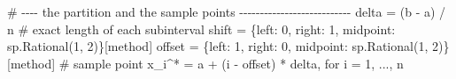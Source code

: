 \documentclass[
  letterpaper,
  DIV=11,
  numbers=noendperiod]{scrreprt}
\newenvironment{Shaded}{\begin{snugshade}}{\end{snugshade}}
\newcommand{\CommentTok}[1]{\textcolor[rgb]{0.37,0.37,0.37}{#1}}
\newcommand{\DecValTok}[1]{\textcolor[rgb]{0.68,0.00,0.00}{#1}}
\newcommand{\NormalTok}[1]{\textcolor[rgb]{0.00,0.23,0.31}{#1}}
\newcommand{\OperatorTok}[1]{\textcolor[rgb]{0.37,0.37,0.37}{#1}}
\newcommand{\StringTok}[1]{\textcolor[rgb]{0.13,0.47,0.30}{#1}}
\theoremstyle{plain}
\theoremstyle{plain}
\theoremstyle{definition}
\theoremstyle{definition}
\theoremstyle{definition}
\theoremstyle{plain}
\theoremstyle{plain}
\theoremstyle{remark}
\begin{document}
\begin{Shaded}
\begin{Highlighting}[]
    \CommentTok{\# {-}{-}{-}{-} the partition and the sample points {-}{-}{-}{-}{-}{-}{-}{-}{-}{-}{-}{-}{-}{-}{-}{-}{-}{-}{-}{-}{-}{-}{-}{-}{-}{-}{-}}
\NormalTok{    delta }\OperatorTok{=}\NormalTok{ (b }\OperatorTok{{-}}\NormalTok{ a) }\OperatorTok{/}\NormalTok{ n                    }\CommentTok{\# exact length of each subinterval}
\NormalTok{    shift }\OperatorTok{=}\NormalTok{ \{}\StringTok{\textquotesingle{}left\textquotesingle{}}\NormalTok{: }\DecValTok{0}\NormalTok{, }\StringTok{\textquotesingle{}right\textquotesingle{}}\NormalTok{: }\DecValTok{1}\NormalTok{, }\StringTok{\textquotesingle{}midpoint\textquotesingle{}}\NormalTok{: sp.Rational(}\DecValTok{1}\NormalTok{, }\DecValTok{2}\NormalTok{)\}[method]}
\NormalTok{    offset }\OperatorTok{=}\NormalTok{ \{}\StringTok{\textquotesingle{}left\textquotesingle{}}\NormalTok{: }\DecValTok{1}\NormalTok{, }\StringTok{\textquotesingle{}right\textquotesingle{}}\NormalTok{: }\DecValTok{0}\NormalTok{, }\StringTok{\textquotesingle{}midpoint\textquotesingle{}}\NormalTok{: sp.Rational(}\DecValTok{1}\NormalTok{, }\DecValTok{2}\NormalTok{)\}[method]}
    \CommentTok{\# sample point x\_i\^{}* = a + (i {-} offset) * delta, for i = 1, ..., n}


\end{Highlighting}
\end{Shaded}
\end{document}
